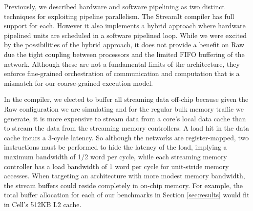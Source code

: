 Previously, we described hardware and software pipelining as two
distinct techniques for exploiting pipeline parallelism.  The StreamIt
compiler has full support for each.  However it also implements a
hybrid approach where hardware pipelined units are scheduled in a
software pipelined loop.  While we were excited by the possibilities
of the hybrid approach, it does not provide a benefit on Raw due the
tight coupling between processors and the limited FIFO buffering of
the network. Although these are not a fundamental limits of the
architecture, they enforce fine-grained orchestration of communication
and computation that is a mismatch for our coarse-grained execution
model.



In the compiler, we elected to buffer all streaming data off-chip
because given the Raw configuration we are simulating and for the
regular bulk memory traffic we generate, it is more expensive to
stream data from a core's local data cache than to stream the data
from the streaming memory controllers. A load hit in the data cache
incurs a 3-cycle latency.  So although the networks are
register-mapped, two instructions must be performed to hide the
latency of the load, implying a maximum bandwidth of 1/2 word per
cycle, while each streaming memory controller has a load bandwidth of
1 word per cycle for unit-stride memory accesses.  When targeting an
architecture with more modest memory bandwidth, the stream buffers
could reside completely in on-chip memory.  For example, the total
buffer allocation for each of our benchmarks in Section
\ref{sec:results} would fit in Cell's 512KB L2 cache.

